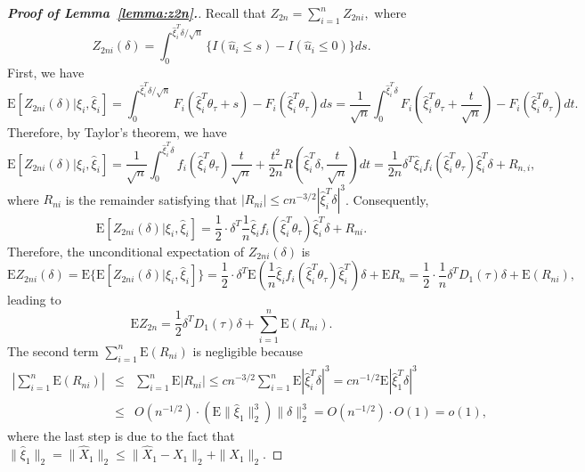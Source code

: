 \documentclass[times,sort&compress,3p]{elsarticle}
\theoremstyle{plain}%
\theoremstyle{definition}
\newcommand{\bD}{{D}}
\newcommand{\btheta}{{\theta}}
\newcommand{\bxi}{{\xi}}
\begin{document}
	
\begin{proof}[\textbf{\upshape Proof of Lemma~\ref{lemma:z2n}.}] 
Recall that $Z_{2n} = \sum_{i = 1}^n Z_{2ni},$ where 
	\begin{equation}
		Z_{2ni}({\delta}) = \int_{0}^{\widehat{\bxi}_i^T {\delta}/\sqrt{n}}
		\{I(\widehat{u}_i \leq s) - I(\widehat{u}_i \leq 0)\} ds. 
	\end{equation}
	First, we have 
	\begin{equation}
		\text{E}[Z_{2ni}({\delta}) | \bxi_{i}, \widehat{\bxi}_i] =  \int_{0}^{\widehat{\bxi}_i^T
			{\delta}/\sqrt{n}} F_i(\widehat{\bxi}_i^T \btheta_{\tau}  + s) -  F_i(\widehat{\bxi}_i^T
		\btheta_{\tau} ) ds = \frac{1}{\sqrt{n}} \int_0^{\widehat{\bxi}_i^T {\delta}}  F_i(\widehat{\bxi}_i^T \btheta_{\tau}  + \frac{t}{\sqrt{n}}) -  F_i(\widehat{\bxi}_i^T
		\btheta_{\tau} ) dt. 
	\end{equation}
	Therefore, by Taylor's theorem, we have 
	$$  \text{E}[Z_{2ni}({\delta}) | \bxi_{i}, \widehat{\bxi}_i] = \frac{1}{\sqrt{n}} \int_0^{\widehat{\bxi}_i^T {\delta}} f_i(\widehat{\bxi}_i^T
	\btheta_{\tau} )\frac{t}{\sqrt{n}} + \frac{t^2}{2n} R(\widehat{\bxi}_i^T {\delta}, \frac{t}{\sqrt{n}}) dt = \frac{1}{2n} {\delta}^T \widehat{\bxi}_i f_i(\widehat{\bxi}_i^T
	\btheta_{\tau} ) \widehat{\bxi}_i^{T} {\delta} + R_{n,i}, 
	$$
	where $R_{ni}$ is the remainder satisfying that $|R_{ni}| \leq c n^{-3/2} |\widehat{\bxi}_i^T {\delta}|^3$.  Consequently, 
	$$  \text{E}[Z_{2ni}({\delta}) | \bxi_{i}, \widehat{\bxi}_i] =   \frac{1}{2} \cdot {\delta}^T \frac{1}{n} \widehat{\bxi}_i f_i(\widehat{\bxi}_i^T
	\btheta_{\tau} ) \widehat{\bxi}_i^{T} {\delta} + R_{ni}.  $$
	Therefore, the unconditional expectation of $Z_{2ni}({\delta})$ is 
	$$
	\text{E} Z_{2ni}({\delta})  = \text{E} \{ \text{E} [Z_{2ni}({\delta})|\bxi_{i}, \widehat{\bxi}_i]
	\} =  \frac{1}{2} \cdot {\delta}^T \text{E} \left( \frac{1}{n} \widehat{\bxi}_i f_i(\widehat{\bxi}_i^T
	\btheta_{\tau} ) \widehat{\bxi}_i^{T} \right) {\delta} + \text{E} R_n = \frac{1}{2} \cdot \frac{1}{n} {\delta}^T \bD_1(\tau)  {\delta} + \text{E}(R_{ni}),
	$$ 
	leading to 
	$$\text{E} Z_{2n}=\frac{1}{2} {\delta}^T \bD_1(\tau)  {\delta} + \sum_{i=1}^{n}\text{E} (R_{ni}).$$
	The second term $\sum_{i=1}^{n}\text{E} (R_{ni})$ is negligible because 
	\begin{eqnarray}
		\left|\sum_{i=1}^{n}\text{E} (R_{ni})\right|& \leq& \sum_{i=1}^n \text{E}|R_{ni}|
		\leq c n^{-3/2}\sum_{i=1}^n \text{E} |\widehat{\bxi}_{i}^{T}{\delta}|^{3} = c n^{-1/2} \text{E} |\widehat{\bxi}_{1}^{T}{\delta}|^{3}\\
		&\leq& O(n^{-1/2}) \cdot \left(\text{E}\|\widehat{\bxi}_{1}\|^3_2 \right)\|{\delta}\|_2^3 =  O(n^{-1/2}) \cdot O(1) = o(1),
	\end{eqnarray}
	where the last step is due to the fact that $\|\widehat{\bxi}_{1}\|_2=\|\widehat{X}_{1}\|_2\leq \|\widehat{X}_{1}-X_1\|_2 +\|X_{1}\|_2$. 
	

\end{proof}
\end{document}
